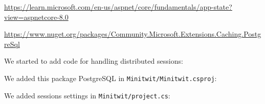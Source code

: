 \url{https://learn.microsoft.com/en-us/aspnet/core/fundamentals/app-state?view=aspnetcore-8.0}

\url{https://www.nuget.org/packages/Community.Microsoft.Extensions.Caching.PostgreSql}

We started to add code for handling distributed sessions:

We added this package PostgreSQL in \texttt{Minitwit/Minitwit.csproj}:


We added sessions settings in \texttt{Minitwit/project.cs}:



